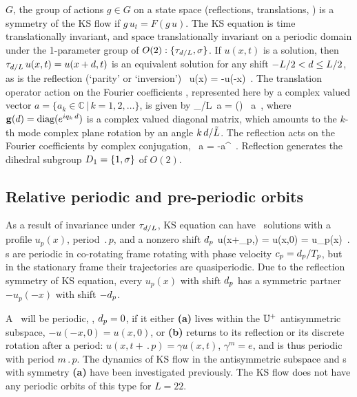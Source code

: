 \documentclass[aip,cha,showpacs,reprint]{revtex4-1} %
\begin{document}
$G$, the group of actions $ g \in G $ on a
state space (reflections, translations, \etc) is a symmetry of the KS
flow  if $g\,u_t = F(g\,u)$.
The KS equation is time translationally invariant, and space translationally invariant
on a periodic domain under
the 1-parameter group of
$O(2): \{\tau_{d/L},\sigma \}$.
If $u(x,t)$ is a solution, then
$\tau_{d/L}\, u(x,t) = u(x+d,t)$
is an equivalent solution for any shift
$-L/2 < d \leq L/2$,
as is the
reflection (`parity' or `inversion')
\beq
    \Refl \, u(x) = -u(-x)
\,.
\label{KSparity}
\eeq
The translation operator action on the Fourier coefficients ,
represented here by a complex valued vector
$a = \{a_k\in\mathbb{C}\,|\,k = 1, 2, \ldots\}$, is given by
\beq
  \Shift_{\shift/L}\, a = (\shift) \, a \,,
\label{eq:shiftFour}
\eeq
where $\mathbf{g}(d) = \mbox{diag}( e^{i q_k\, d} )$ is a complex
valued diagonal matrix, which amounts to the $k$-th mode complex plane
rotation by an angle $k\, d /\tilde{L}$.  The reflection acts on
the Fourier coefficients by complex conjugation,
\beq
  \Refl \, a = -a^\ast
\,.
\label{FModInvSymm}
\eeq
Reflection generates the dihedral subgroup $D_1 = \{1, \sigma\}$
of $O(2)$.

\subsection{Relative periodic and pre-periodic orbits}
\label{s:rpoNumerics}

As a result of invariance under $\tau_{d/L}$,
KS equation can have \rpo\ solutions
with a profile $u_p(x)$, period $\period{p}$, and a
nonzero shift $d_p$
\beq
  u(x+\shift_p,) = u(x,0) = u_p(x)
\,.
\label{eq:KSrpos}
\eeq
{\Rpo s} are periodic in
co-rotating frame rotating with phase velocity
$c_p=d_p/{T_{p}}$, but in the stationary frame
their trajectories are quasiperiodic.  Due to the reflection symmetry
 of KS equation, every {\rpo} $u_p(x)$ with shift
$d_p$ has a symmetric partner $-u_p(-x)$ with shift $-d_p$.

A \rpo\ will be periodic, \ie, $d_p = 0$, if it either {\bf (a)}
lives within the $\mathbb{U}^+$ antisymmetric subspace, $-u(-x,0) = u(x,0)$, or
{\bf (b)} returns to its reflection or its discrete rotation after a
period: $u(x,t+\period{p})=\gamma u(x,t)$, $\gamma^m=e$, and is thus
periodic with period $m\period{p}$. The dynamics of KS flow in the
antisymmetric subspace and \po s with symmetry {\bf (a)} have been
investigated previously. The KS
flow does not have any periodic orbits of this type for $L = 22$.
\end{document}
